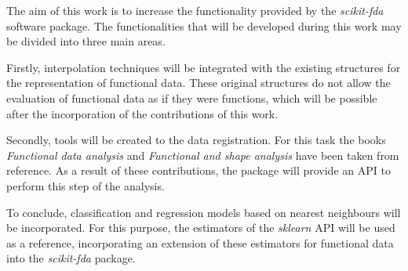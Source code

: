 

The aim of this work is to increase the functionality provided by the
\textit{scikit-fda} software package. The functionalities that will
be developed during this work may be divided into three main areas.

Firstly, interpolation techniques will be integrated with the existing
structures for the representation of functional data. These original structures
do not allow the evaluation of functional data as if they were functions,
which will be possible after the incorporation of the contributions of this work.

Secondly, tools will be created to the data registration. For this task
the books \textit{Functional data analysis}\cite{Ramsay2005} and
\textit{Functional and shape analysis}\cite{Srivastava2016} have been taken from
reference. As a result of these contributions, the package will provide an \ac{API}
to perform this step of the analysis.

To conclude, classification and regression models based on nearest neighbours
will be incorporated. For this purpose,
the estimators of the \textit{sklearn}\cite{sklearn} \acs{API} will be used as a reference,
incorporating an extension of these estimators for functional data
into the \textit{scikit-fda} package.

